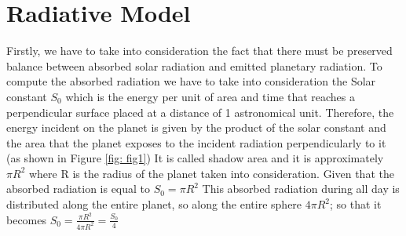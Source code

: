 \section{Radiative Model}
Firstly, we have to take into consideration the fact that there must be preserved balance between absorbed solar radiation and emitted planetary radiation.
To compute the absorbed radiation we have to take into consideration the Solar constant $S_{0}$ which is the energy per unit of area and time that reaches a perpendicular surface placed at a distance of 1 astronomical unit. Therefore, the energy incident on the planet is given by the product of the solar constant and the area that the planet exposes to the incident radiation perpendicularly to it (as shown in Figure \ref{fig: fig1})
It is called shadow area and it is approximately $\pi R^2$ where R is the radius of the planet taken into consideration.
Given that the absorbed radiation is equal to $S_{0}= \pi R^2$
This absorbed radiation during all day is distributed along the entire planet, so along the entire sphere $4\pi R^2$; so that it becomes $S_{0}= \frac{\pi R^2}{4\pi R^2}=\frac{S_{0}}{4}$

